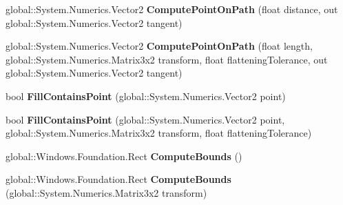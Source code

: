 \begin{DoxyCompactItemize}
\item 
\mbox{\label{class_microsoft_1_1_graphics_1_1_canvas_1_1_geometry_1_1_canvas_geometry_a59cbc03d8d69b1b5eb3ac79a8e38ec04}} 
global\+::\+System.\+Numerics.\+Vector2 {\bfseries Compute\+Point\+On\+Path} (float distance, out global\+::\+System.\+Numerics.\+Vector2 tangent)
\item 
\mbox{\label{class_microsoft_1_1_graphics_1_1_canvas_1_1_geometry_1_1_canvas_geometry_a6bc7857a0a83e9f54a5231413995be25}} 
global\+::\+System.\+Numerics.\+Vector2 {\bfseries Compute\+Point\+On\+Path} (float length, global\+::\+System.\+Numerics.\+Matrix3x2 transform, float flattening\+Tolerance, out global\+::\+System.\+Numerics.\+Vector2 tangent)
\item 
\mbox{\label{class_microsoft_1_1_graphics_1_1_canvas_1_1_geometry_1_1_canvas_geometry_a33d42974c81157630960db493eedc046}} 
bool {\bfseries Fill\+Contains\+Point} (global\+::\+System.\+Numerics.\+Vector2 point)
\item 
\mbox{\label{class_microsoft_1_1_graphics_1_1_canvas_1_1_geometry_1_1_canvas_geometry_a5952326043566da1708fc1be2b2677c0}} 
bool {\bfseries Fill\+Contains\+Point} (global\+::\+System.\+Numerics.\+Vector2 point, global\+::\+System.\+Numerics.\+Matrix3x2 transform, float flattening\+Tolerance)
\item 
\mbox{\label{class_microsoft_1_1_graphics_1_1_canvas_1_1_geometry_1_1_canvas_geometry_abdbf95c37d4fceb533f79fc841fb2226}} 
global\+::\+Windows.\+Foundation.\+Rect {\bfseries Compute\+Bounds} ()
\item 
\mbox{\label{class_microsoft_1_1_graphics_1_1_canvas_1_1_geometry_1_1_canvas_geometry_a5764fbff119976df677cb8f61c790158}} 
global\+::\+Windows.\+Foundation.\+Rect {\bfseries Compute\+Bounds} (global\+::\+System.\+Numerics.\+Matrix3x2 transform)
\item 

\end{DoxyCompactItemize}
